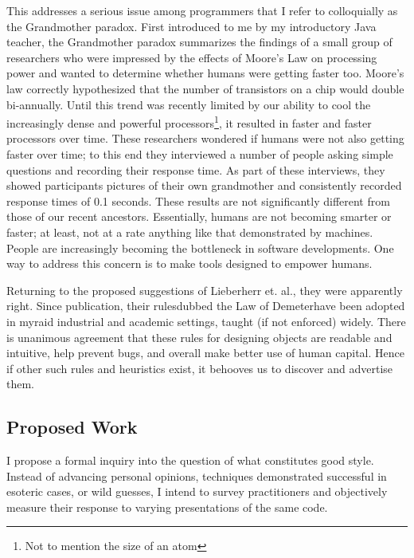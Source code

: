 \documentclass{article}
\begin{document}
This addresses a serious issue among programmers that I refer to colloquially as the Grandmother paradox.
First introduced to me by my introductory Java teacher, the Grandmother paradox summarizes the findings of a small group of researchers who were impressed by the effects of Moore's Law on processing power and wanted to determine whether humans were getting faster too.
Moore's law correctly hypothesized that the number of transistors on a chip would double bi-annually.
Until this trend was recently limited by our ability to cool the increasingly dense and powerful processors\footnote{Not to mention the size of an atom}, it resulted in faster and faster processors over time.
These researchers wondered if humans were not also getting faster over time; to this end they interviewed a number of people asking simple questions and recording their response time.
As part of these interviews, they showed participants pictures of their own grandmother and consistently recorded response times of 0.1 seconds.
These results are not significantly different from those of our recent ancestors. 
Essentially, humans are not becoming smarter or faster; at least, not at a rate anything like that demonstrated by machines. 
People are increasingly becoming the bottleneck in software developments. 
One way to address this concern is to make tools designed to empower humans.

Returning to the proposed suggestions of Lieberherr et. al., they were apparently right.
Since publication, their rules\textemdash dubbed the Law of Demeter\textemdash  have been adopted in myraid industrial and academic settings, taught (if not enforced) widely.
There is unanimous agreement that these rules for designing objects are readable and intuitive, help prevent bugs, and overall make better use of human capital.
Hence if other such rules and heuristics exist, it behooves us to discover and advertise them.

\subsection*{Proposed Work}
I propose a formal inquiry into the question of what constitutes good style. 
Instead of advancing personal opinions, techniques demonstrated successful in esoteric cases, or wild guesses, I intend to survey practitioners and objectively measure their response to varying presentations of the same code.
\end{document}
